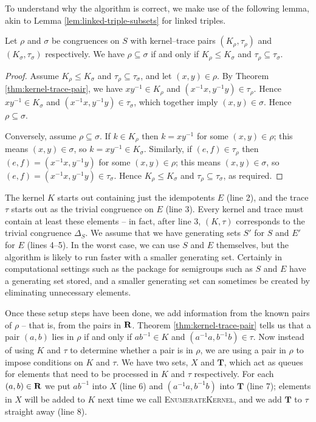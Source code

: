 
To understand why the algorithm is correct, we make use of the following lemma,
akin to Lemma \ref{lem:linked-triple-subsets} for linked triples.

\begin{lemma}
  \label{lem:kertr-subsets}
  Let $\rho$ and $\sigma$ be congruences on $S$ with kernel--trace pairs
  $(K_\rho, \tau_\rho)$ and $(K_\sigma, \tau_\sigma)$ respectively.  We have
  $\rho \subseteq \sigma$ if and only if $K_\rho \leq K_\sigma$ and
  $\tau_\rho \subseteq \tau_\sigma$.
  \begin{proof}
    Assume $K_\rho \leq K_\sigma$ and $\tau_\rho \subseteq \tau_\sigma$, and let
    $(x,y) \in \rho$.  By Theorem \ref{thm:kernel-trace-pair}, we have
    $xy^{-1} \in K_\rho$ and $(x^{-1}x, y^{-1}y) \in \tau_\rho$.  Hence
    $xy^{-1} \in K_\sigma$ and $(x^{-1}x, y^{-1}y) \in \tau_\sigma$, which
    together imply $(x,y) \in \sigma$.  Hence $\rho \subseteq \sigma$.

    Conversely, assume $\rho \subseteq \sigma$.  If $k \in K_\rho$ then
    $k=xy^{-1}$ for some $(x,y) \in \rho$; this means $(x,y) \in \sigma$, so
    $k=xy^{-1} \in K_\sigma$.  Similarly, if $(e,f) \in \tau_\rho$ then
    $(e,f) = (x^{-1}x, y^{-1}y)$ for some $(x,y) \in \rho$; this means
    $(x,y) \in \sigma$, so $(e,f) = (x^{-1}x, y^{-1}y) \in \tau_\sigma$.  Hence
    $K_\rho \leq K_\sigma$ and $\tau_\rho \subseteq \tau_\sigma$, as
    required.
  \end{proof}
\end{lemma}

The kernel $K$ starts out containing just the idempotents $E$ (line 2), and the trace
$\tau$ starts out as the trivial congruence on $E$ (line 3).  Every kernel and trace must
contain at least these elements -- in fact, after line 3, $(K, \tau)$ corresponds to
the trivial congruence $\Delta_S$.  We assume that we have generating sets $S'$
for $S$ and $E'$ for $E$ (lines 4--5).  In the worst case, we can use $S$ and $E$ themselves,
but the algorithm is likely to run faster with a smaller generating set.
Certainly in computational settings such as the \Semigroups{} package for \GAP{}
\cite{semigroups} semigroups such as $S$ and $E$ have a generating set stored,
and a smaller generating set can sometimes be created by eliminating unnecessary
elements.

Once these setup steps have been done, we add information from the known pairs
of $\rho$ -- that is, from the pairs in $\mathbf{R}$.  Theorem
\ref{thm:kernel-trace-pair} tells us that a pair $(a,b)$ lies in $\rho$ if and
only if $ab^{-1} \in K$ and $(a^{-1}a, b^{-1}b) \in \tau$.  Now instead of using
$K$ and $\tau$ to determine whether a pair is in $\rho$, we are using a pair in
$\rho$ to impose conditions on $K$ and $\tau$.  We have two sets, $X$ and
$\mathbf{T}$, which act as queues for elements that need to be processed in $K$
and $\tau$ respectively.  For each $(a,b) \in \mathbf{R}$ we put $ab^{-1}$ into
$X$ (line 6) and $(a^{-1}a, b^{-1}b)$ into $\mathbf{T}$ (line 7); elements in $X$ will be added
to $K$ next time we call \textsc{EnumerateKernel}, and we add $\mathbf{T}$ to
$\tau$ straight away (line 8).

